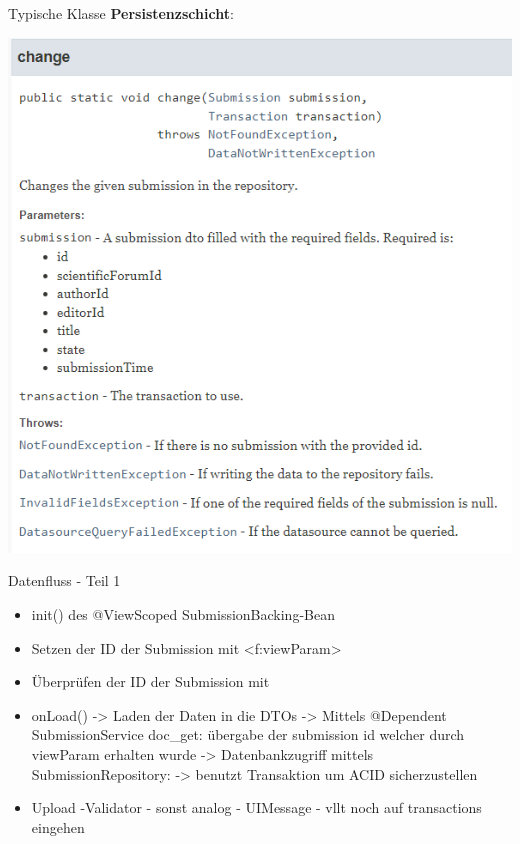 \documentclass{beamer}
\begin{document}
\begin{frame}{Typische Klasse \textbf{Persistenzschicht}:}
\begin{itemize}
            \includegraphics[height=1.1\textheight]{graphics/repo/doc_change}

        \end{itemize}
    \end{frame}


    \begin{frame}{Datenfluss - Teil 1}
        \begin{itemize}
            \item init() des @ViewScoped SubmissionBacking-Bean
            \item Setzen der ID der Submission mit <f:viewParam>
            \item Überprüfen der ID der Submission mit %
            \item onLoad()
            -> Laden der Daten in die DTOs
            -> Mittels @Dependent SubmissionService doc_get: übergabe der submission id
            welcher durch viewParam erhalten wurde
            -> Datenbankzugriff mittels SubmissionRepository:
            -> benutzt Transaktion um ACID sicherzustellen
            \item Upload
            -Validator
            - sonst analog
            - UIMessage
            - vllt noch auf transactions eingehen
        \end{itemize}
    \end{frame}
\end{document}
